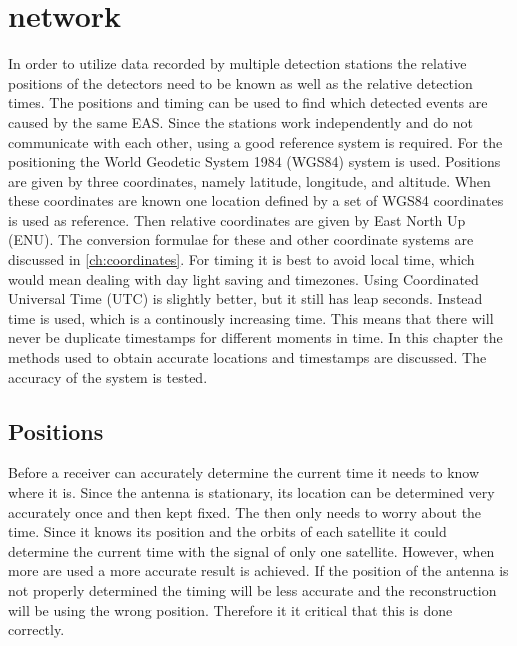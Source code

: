 \chapter{\hisparc network}
\label{ch:cluster}

In order to utilize data recorded by multiple \hisparc detection stations the relative positions of the detectors need to be known as well as the relative detection times. The positions and timing can be used to find which detected events are caused by the same EAS. Since the stations work independently and do not communicate with each other, using a good reference system is required. For the positioning the World Geodetic System 1984 (WGS84) system is used. Positions are given by three coordinates, namely latitude, longitude, and altitude. When these coordinates are known one location defined by a set of WGS84 coordinates is used as reference. Then relative coordinates are given by East North Up (ENU). The conversion formulae for these and other coordinate systems are discussed in \cref{ch:coordinates}. For timing it is best to avoid local time, which would mean dealing with day light saving and timezones. Using Coordinated Universal Time (UTC) is slightly better, but it still has leap seconds. Instead \gps time is used, which is a continously increasing time. This means that there will never be duplicate timestamps for different moments in time. In this chapter the methods used to obtain accurate \gps locations and timestamps are discussed. The accuracy of the \gps system is tested.


\section{Positions}

Before a \gps receiver can accurately determine the current time it needs to know where it is. Since the \gps antenna is stationary, its location can be determined very accurately once and then kept fixed. The \gps then only needs to worry about the time. Since it knows its position and the orbits of each \gps satellite it could determine the current time with the signal of only one \gps satellite. However, when more are used a more accurate result is achieved. If the position of the \gps antenna is not properly determined the timing will be less accurate and the reconstruction will be using the wrong position. Therefore it it critical that this is done correctly.



